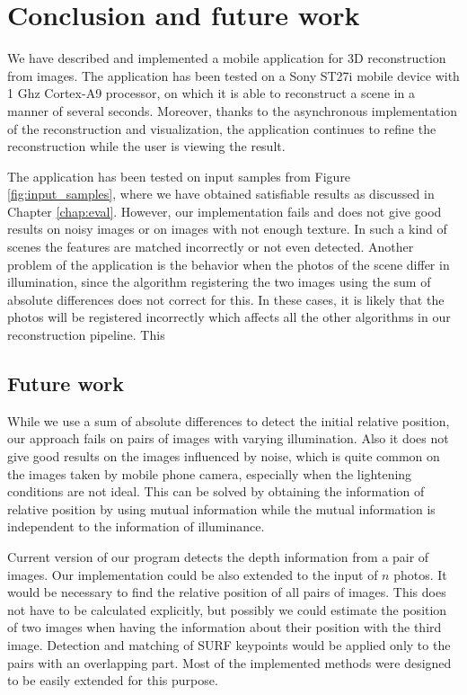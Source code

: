 \chapter*{Conclusion and future work}

We have described and implemented a mobile application for 3D reconstruction from images. 
The application has been tested on a Sony ST27i mobile device with 1 Ghz Cortex-A9 processor, on which it is able to reconstruct a scene in a manner of several seconds. 
Moreover, thanks to the asynchronous implementation of the reconstruction and visualization, the application continues to refine the reconstruction while the user is viewing the result.

The application has been tested on input samples from Figure \ref{fig:input_samples}, where we have obtained satisfiable results as discussed in Chapter \ref{chap:eval}.
However, our implementation fails and does not give good results on noisy images or on images with not enough texture. 
In such a kind of scenes the features are matched incorrectly or not even detected.
Another problem of the application is the behavior when the photos of the scene differ in illumination, since the algorithm registering the two images using the sum of absolute differences does not correct for this.
In these cases, it is likely that the photos will be registered incorrectly which affects all the other algorithms in our reconstruction pipeline. 
This 

\section*{Future work}

While we use a sum of absolute differences to detect the initial relative position, our approach fails on pairs of images with varying illumination.
Also it does not give good results on the images influenced by noise, which is quite common on the images taken by mobile phone camera, 
especially when the lightening conditions are not ideal.
This can be solved by obtaining the information of relative position by using mutual information while the mutual information is independent to the information of illuminance.

Current version of our program detects the  depth information from a pair of images.
Our implementation could be also extended to the input of $n$ photos. 
It would be necessary to find the relative position of all pairs of images.
This does not have to be calculated explicitly, but possibly we could estimate the position of two images when having the information about their position with the third image.
Detection and matching of SURF keypoints would be applied only to the pairs with an overlapping part.
Most of the implemented methods were designed to be easily extended for this purpose.

